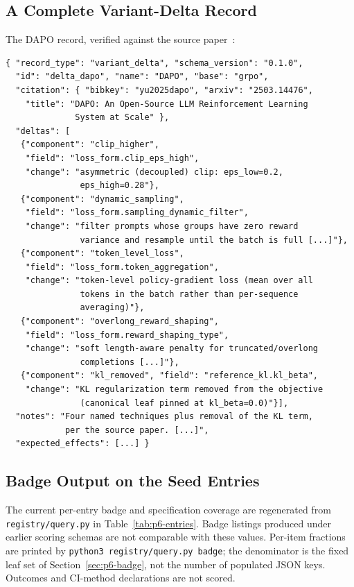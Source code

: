 \subsection{A Complete Variant-Delta Record}
\label{sec:p6-appendix-delta}
The DAPO record, verified against the source paper~\citep{yu2025dapo}:

\begin{lstlisting}[basicstyle=\ttfamily\scriptsize, frame=single,
  caption={\texttt{entries/delta_dapo.json} (whitespace compressed;
  maintenance notes and the \texttt{expected\_effects} block elided as
  \texttt{[...]}). Each \texttt{field} is a \texttt{min\_report} leaf.},
  label={lst:p6-delta-dapo}]
{ "record_type": "variant_delta", "schema_version": "0.1.0",
  "id": "delta_dapo", "name": "DAPO", "base": "grpo",
  "citation": { "bibkey": "yu2025dapo", "arxiv": "2503.14476",
    "title": "DAPO: An Open-Source LLM Reinforcement Learning
              System at Scale" },
  "deltas": [
   {"component": "clip_higher",
    "field": "loss_form.clip_eps_high",
    "change": "asymmetric (decoupled) clip: eps_low=0.2,
               eps_high=0.28"},
   {"component": "dynamic_sampling",
    "field": "loss_form.sampling_dynamic_filter",
    "change": "filter prompts whose groups have zero reward
               variance and resample until the batch is full [...]"},
   {"component": "token_level_loss",
    "field": "loss_form.token_aggregation",
    "change": "token-level policy-gradient loss (mean over all
               tokens in the batch rather than per-sequence
               averaging)"},
   {"component": "overlong_reward_shaping",
    "field": "loss_form.reward_shaping_type",
    "change": "soft length-aware penalty for truncated/overlong
               completions [...]"},
   {"component": "kl_removed", "field": "reference_kl.kl_beta",
    "change": "KL regularization term removed from the objective
               (canonical leaf pinned at kl_beta=0.0)"}],
  "notes": "Four named techniques plus removal of the KL term,
            per the source paper. [...]",
  "expected_effects": [...] }
\end{lstlisting}

\subsection{Badge Output on the Seed Entries}
\label{sec:p6-appendix-badge}
The current per-entry badge and specification coverage are regenerated from
\texttt{registry/query.py} in Table~\ref{tab:p6-entries}. Badge listings
produced under earlier scoring schemas are not comparable with these values.
Per-item fractions are printed by
\texttt{python3 registry/query.py badge}; the denominator is the fixed leaf set
of Section~\ref{sec:p6-badge}, not the number of populated JSON keys. Outcomes and CI-method declarations are not scored.
\endinput
// ... historical badge output below omitted from manuscript ...
